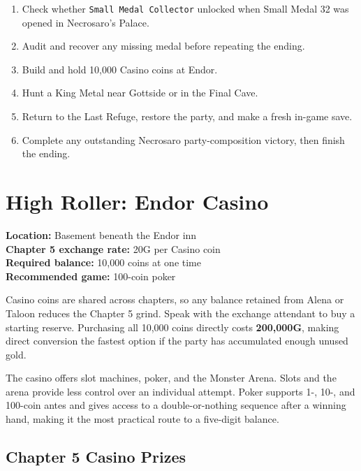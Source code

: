 \documentclass[
  american,
  10pt,
  letterpaper,
  oneside,
  open=any]{scrreprt}
\providecommand{\tightlist}{%
  \setlength{\itemsep}{0pt}\setlength{\parskip}{0pt}}
\begin{document}
\begin{enumerate}
\def\labelenumi{\arabic{enumi}.}
\tightlist
\item
  Check whether \texttt{Small\ Medal\ Collector} unlocked when Small
  Medal 32 was opened in Necrosaro's Palace.
\item
  Audit and recover any missing medal before repeating the ending.
\item
  Build and hold 10,000 Casino coins at Endor.
\item
  Hunt a King Metal near Gottside or in the Final Cave.
\item
  Return to the Last Refuge, restore the party, and make a fresh in-game
  save.
\item
  Complete any outstanding Necrosaro party-composition victory, then
  finish the ending.
\end{enumerate}

\section{High Roller: Endor Casino}\label{high-roller-endor-casino}

\textbf{Location:} Basement beneath the Endor inn\\
\textbf{Chapter 5 exchange rate:} 20G per Casino coin\\
\textbf{Required balance:} 10,000 coins at one time\\
\textbf{Recommended game:} 100-coin poker

Casino coins are shared across chapters, so any balance retained from
Alena or Taloon reduces the Chapter 5 grind. Speak with the exchange
attendant to buy a starting reserve. Purchasing all 10,000 coins
directly costs \textbf{200,000G}, making direct conversion the fastest
option if the party has accumulated enough unused gold.

The casino offers slot machines, poker, and the Monster Arena. Slots and
the arena provide less control over an individual attempt. Poker
supports 1-, 10-, and 100-coin antes and gives access to a
double-or-nothing sequence after a winning hand, making it the most
practical route to a five-digit balance.

\subsection{Chapter 5 Casino Prizes}\label{chapter-5-casino-prizes}
\end{document}

